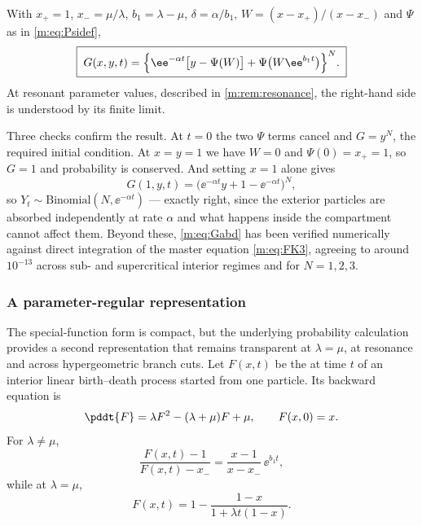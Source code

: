 \begin{proposition}
\label{m:prop:Gabd}
With $x_+=1$, $x_-=\mu/\lambda$, $b_1 = \lambda-\mu$, $\delta = \alpha/b_1$,
$W = (x-x_+)/(x-x_-)$ and $\Psi$ as in \cref{m:eq:Psidef},
\begin{equation}
\label{m:eq:Gabd}
\boxed{\;
G(x,y,t) = \Bigl\{\ee^{-\alpha t}\bigl[y-\Psi(W)\bigr] + \Psi\bigl(W\ee^{b_1t}\bigr)\Bigr\}^{N}. \;}
\end{equation}
At resonant parameter values, described in \cref{m:rem:resonance}, the right-hand
side is understood by its finite limit.
\end{proposition}

Three checks confirm the result. At $t=0$ the two $\Psi$ terms cancel and $G=y^N$,
the required initial condition. At $x=y=1$ we have $W=0$ and $\Psi(0)=x_+=1$, so
$G=1$ and probability is conserved. And setting $x=1$ alone gives
\begin{equation*}
G(1,y,t) = \bigl(\ee^{-\alpha t}y + 1-\ee^{-\alpha t}\bigr)^N,
\end{equation*}
so $Y_t\sim\text{Binomial}(N,\ee^{-\alpha t})$ --- exactly right, since the
exterior particles are absorbed independently at rate $\alpha$ and what happens
inside the compartment cannot affect them. Beyond these, \cref{m:eq:Gabd} has been
verified numerically against direct integration of the master equation
\cref{m:eq:FK3}, agreeing to around $10^{-13}$ across sub- and supercritical interior
regimes and for $N=1,2,3$.

\subsubsection{A parameter-regular representation}
\label{m:sec:regularrep}

The special-function form is compact, but the underlying probability calculation
provides a second representation that remains transparent at $\lambda=\mu$, at
resonance and across hypergeometric branch cuts. Let $F(x,t)$ be the \pgf{} at
time $t$ of an interior linear birth--death process started from one particle. Its
backward equation is
\begin{equation}
\label{m:eq:Fbackward}
\pddt{F} = \lambda F^2 - (\lambda+\mu)F + \mu,
\qquad F(x,0) = x .
\end{equation}
For $\lambda\neq\mu$,
\begin{equation}
\label{m:eq:Fratio}
\frac{F(x,t)-1}{F(x,t)-x_-} = \frac{x-1}{x-x_-}\,\ee^{b_1 t},
\end{equation}
while at $\lambda=\mu$,
\begin{equation}
\label{m:eq:Fcritical}
F(x,t) = 1 - \frac{1-x}{1+\lambda t(1-x)} .
\end{equation}

